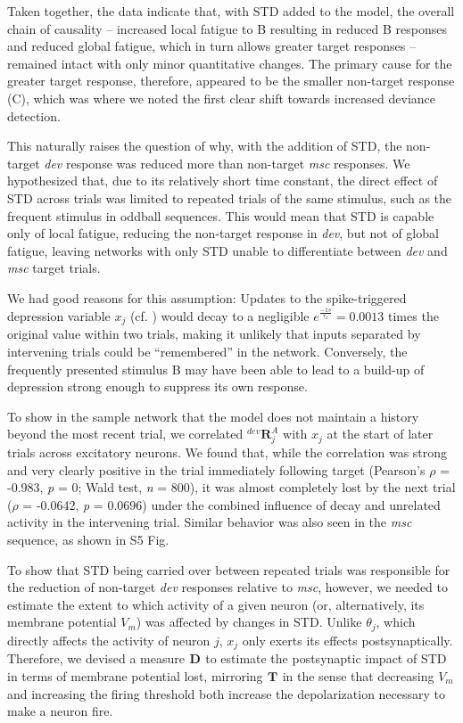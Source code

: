 \documentclass[9pt,lineno,onehalfspacing]{elife}
\newcommand{\dev}{\textit{dev}}
\newcommand{\msc}{\textit{msc}}
\newcommand{\R}[3][]{{}^{#1}_{}\boldsymbol R^{#2}_{#3}}
\newcommand{\T}[3][]{{}^{#1}_{}\boldsymbol T^{#2}_{#3}}
\newcommand{\D}[3][]{{}^{#1}_{}\boldsymbol D^{#2}_{#3}}
\begin{document}
Taken together, the data indicate that, with STD added to the model, the overall chain of causality -- increased local fatigue to B resulting in reduced B responses and reduced global fatigue, which in turn allows greater target responses -- remained intact with only minor quantitative changes. The primary cause for the greater target response, therefore, appeared to be the smaller non-target response (C), which was where we noted the first clear shift towards increased deviance detection.

This naturally raises the question of why, with the addition of STD, the non-target \dev{} response was reduced more than non-target \msc{} responses. We hypothesized that, due to its relatively short time constant, the direct effect of STD across trials was limited to repeated trials of the same stimulus, such as the frequent stimulus in oddball sequences. This would mean that STD is capable only of local fatigue, reducing the non-target response in \dev{}, but not of global fatigue, leaving networks with only STD unable to differentiate between \dev{} and \msc{} target trials.

We had good reasons for this assumption: Updates to the spike-triggered depression variable $x_j$ (cf. ) would decay to a negligible $e^\frac{-1 s}{\tau_x} = 0.0013$ times the original value within two trials, making it unlikely that inputs separated by intervening trials could be ``remembered'' in the network. Conversely, the frequently presented stimulus B may have been able to lead to a build-up of depression strong enough to suppress its own response.

To show in the sample network that the model does not maintain a history beyond the most recent trial, we correlated $\R[dev]{A}{j}$ with $x_j$ at the start of later trials across excitatory neurons. We found that, while the correlation was strong and very clearly positive in the trial immediately following target (Pearson's $\rho$ = -0.983, \textit{p} = 0; Wald test, \textit{n} = 800), it was almost completely lost by the next trial ($\rho$ = -0.0642, \textit{p} = 0.0696) under the combined influence of decay and unrelated activity in the intervening trial. Similar behavior was also seen in the \msc{} sequence, as shown in S5 Fig.

To show that STD being carried over between repeated trials was responsible for the reduction of non-target \dev{} responses relative to \msc{}, however, we needed to estimate the extent to which activity of a given neuron (or, alternatively, its membrane potential $V_m$) was affected by changes in STD. Unlike $\theta_j$, which directly affects the activity of neuron $j$, $x_j$ only exerts its effects postsynaptically. Therefore, we devised a measure $\D{}{}$ to estimate the postsynaptic impact of STD in terms of membrane potential lost, mirroring $\T{}{}$ in the sense that decreasing $V_m$ and increasing the firing threshold both increase the depolarization necessary to make a neuron fire.
\end{document}
